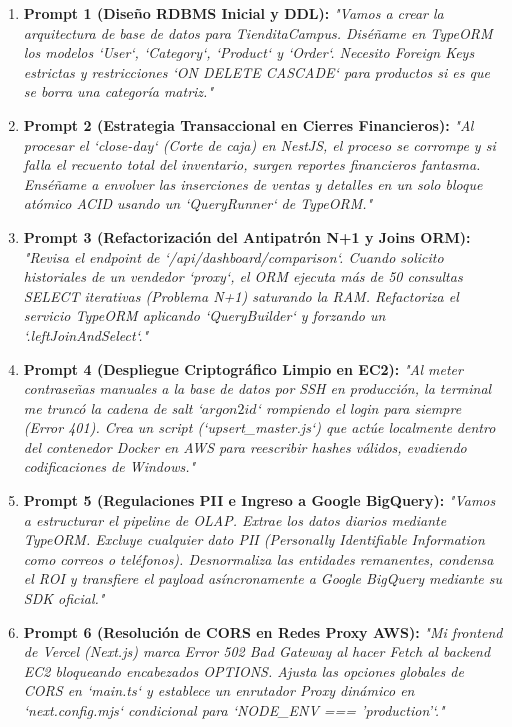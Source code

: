 \documentclass[12pt,a4paper]{article}
\begin{document}
\begin{enumerate}
    \item \textbf{Prompt 1 (Diseño RDBMS Inicial y DDL):} \textit{"Vamos a crear la arquitectura de base de datos para TienditaCampus. Diséñame en TypeORM los modelos `User`, `Category`, `Product` y `Order`. Necesito Foreign Keys estrictas y restricciones `ON DELETE CASCADE` para productos si es que se borra una categoría matriz."}
    
    \item \textbf{Prompt 2 (Estrategia Transaccional en Cierres Financieros):} \textit{"Al procesar el `close-day` (Corte de caja) en NestJS, el proceso se corrompe y si falla el recuento total del inventario, surgen reportes financieros fantasma. Enséñame a envolver las inserciones de ventas y detalles en un solo bloque atómico ACID usando un `QueryRunner` de TypeORM."}
    
    \item \textbf{Prompt 3 (Refactorización del Antipatrón N+1 y Joins ORM):} \textit{"Revisa el endpoint de `/api/dashboard/comparison`. Cuando solicito historiales de un vendedor `proxy`, el ORM ejecuta más de 50 consultas SELECT iterativas (Problema N+1) saturando la RAM. Refactoriza el servicio TypeORM aplicando `QueryBuilder` y forzando un `.leftJoinAndSelect`."}
    
    \item \textbf{Prompt 4 (Despliegue Criptográfico Limpio en EC2):} \textit{"Al meter contraseñas manuales a la base de datos por SSH en producción, la terminal me truncó la cadena de salt `$argon2id$` rompiendo el login para siempre (Error 401). Crea un script (`upsert\_master.js`) que actúe localmente dentro del contenedor Docker en AWS para reescribir hashes válidos, evadiendo codificaciones de Windows."}
    
    \item \textbf{Prompt 5 (Regulaciones PII e Ingreso a Google BigQuery):} \textit{"Vamos a estructurar el pipeline de OLAP. Extrae los datos diarios mediante TypeORM. Excluye cualquier dato PII (Personally Identifiable Information como correos o teléfonos). Desnormaliza las entidades remanentes, condensa el ROI y transfiere el payload asíncronamente a Google BigQuery mediante su SDK oficial."}

    \item \textbf{Prompt 6 (Resolución de CORS en Redes Proxy AWS):} \textit{"Mi frontend de Vercel (Next.js) marca Error 502 Bad Gateway al hacer Fetch al backend EC2 bloqueando encabezados OPTIONS. Ajusta las opciones globales de CORS en `main.ts` y establece un enrutador Proxy dinámico en `next.config.mjs` condicional para `NODE\_ENV === 'production'`."}


\end{enumerate}
\end{document}
